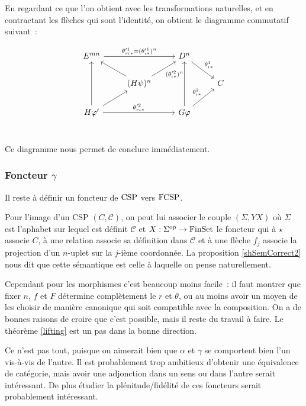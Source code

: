 \begin{pv}
    En regardant ce que l'on obtient avec les transformations naturelles, et en
    contractant les flèches qui sont l'identité, on obtient le diagramme commutatif
    suivant~:

    \[\begin{tikzcd}
        E^{mn}\arrow[rr, "\theta'^1_{r\iota\ast} = (\theta'^1_{\iota\ast})^n"] & &
            D^n\arrow[dr, "\theta^1_{\iota\ast}"] & \\
        & (H\psi)^n\arrow[ur, swap, "(\theta'^2_{\iota\ast})^n"]\arrow[ul] & &
            C \\
        H\phi'\arrow[ur]\arrow[rr, "\theta'^2_{r\iota\ast}"]\arrow[uu] & &
            G\phi\arrow[ur, "\theta^2_{\iota\ast}"]\arrow[uu] & \\
    \end{tikzcd}\]

    Ce diagramme nous permet de conclure immédiatement.
\end{pv}

\subsubsection{Foncteur $\gamma$}\label{secGamma}

Il reste à définir un foncteur de $\text{CSP}$ vers $\text{FCSP}$.

Pour l'image d'un CSP $(C,\mathcal{C})$, on peut lui associer le couple
$(\Sigma, YX)$ où $\Sigma$ est l'aphabet sur lequel est définit $\mathcal{C}$
et $X : \Sigma^{\text{op}}\rightarrow\text{FinSet}$ le foncteur qui à $\star$ associe $C$, à
une relation associe sa définition dans $\mathcal{C}$ et à une flèche $f_j$
associe la projection d'un $n$-uplet sur la $j$-ième coordonnée. La proposition
\ref{shSemCorrect2} nous dit que cette sémantique est celle à laquelle on pense
naturellement.

Cependant pour les morphismes c'est beaucoup moins facile~: il faut montrer
que fixer $n$, $f$ et $F$ détermine complètement le $r$ et $\theta$, ou au moins
avoir un moyen de les choisir de manière canonique qui soit compatible avec la
composition. On a de bonnes raisons de croire que c'est possible, mais il reste
du travail à faire. Le théorème \ref{lifting} est un pas dans la bonne direction.

Ce n'est pas tout, puisque on aimerait bien que $\alpha$ et $\gamma$ se comportent
bien l'un vis-à-vis de l'autre. Il est probablement trop ambitieux d'obtenir
une équivalence de catégorie, mais avoir une adjonction dans un sens ou dans
l'autre serait intéressant. De plus étudier la plénitude/fidélité de ces foncteurs
serait probablement intéressant.

